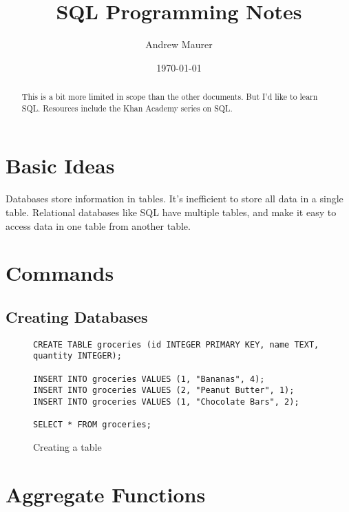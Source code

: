 \documentclass[12pt,reqno]{amsart}
\begin{document}
\title{SQL Programming Notes}
\author{Andrew Maurer}
\date{\today}

\begin{abstract}
  This is a bit more limited in scope than the other documents. But I'd like to learn SQL. Resources include the Khan Academy series on SQL.
\end{abstract}

\maketitle

\begin{center}
  \parbox{4.7in}{
    \tableofcontents
    }
\end{center}

\section{Basic Ideas}
\label{sec:sql-idea}

Databases store information in tables. It's inefficient to store all data in a single table. Relational databases like SQL have multiple tables, and make it easy to access data in one table from another table.

\section{Commands}
\label{sec:commands}

\subsection{Creating Databases}
\label{sec:create}

\begin{figure}[H]
  \centering
  \begin{verbatim}
CREATE TABLE groceries (id INTEGER PRIMARY KEY, name TEXT, quantity INTEGER);

INSERT INTO groceries VALUES (1, "Bananas", 4);
INSERT INTO groceries VALUES (2, "Peanut Butter", 1);
INSERT INTO groceries VALUES (1, "Chocolate Bars", 2);

SELECT * FROM groceries;
  \end{verbatim}
  \caption{Creating a table}
  \label{fig:create_table}
\end{figure}

\section{Aggregate Functions}
\label{sec:aggregate}

\appendix
\end{document}
